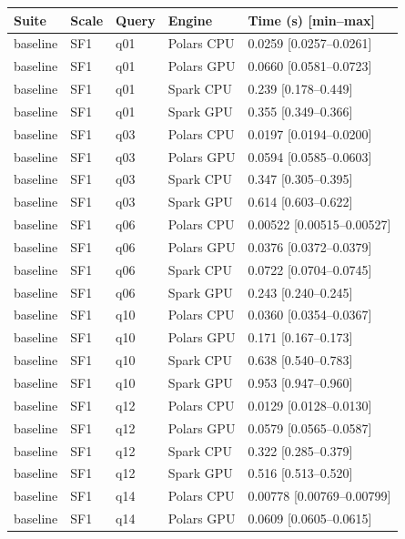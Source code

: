 \begin{longtable}{lllll}
\toprule
Suite & Scale & Query & Engine & Time (s) [min--max] \\
\midrule
\endhead
\bottomrule
\endfoot
baseline & SF1 & q01 & Polars CPU & 0.0259 [0.0257--0.0261] \\
baseline & SF1 & q01 & Polars GPU & 0.0660 [0.0581--0.0723] \\
baseline & SF1 & q01 & Spark CPU & 0.239 [0.178--0.449] \\
baseline & SF1 & q01 & Spark GPU & 0.355 [0.349--0.366] \\
baseline & SF1 & q03 & Polars CPU & 0.0197 [0.0194--0.0200] \\
baseline & SF1 & q03 & Polars GPU & 0.0594 [0.0585--0.0603] \\
baseline & SF1 & q03 & Spark CPU & 0.347 [0.305--0.395] \\
baseline & SF1 & q03 & Spark GPU & 0.614 [0.603--0.622] \\
baseline & SF1 & q06 & Polars CPU & 0.00522 [0.00515--0.00527] \\
baseline & SF1 & q06 & Polars GPU & 0.0376 [0.0372--0.0379] \\
baseline & SF1 & q06 & Spark CPU & 0.0722 [0.0704--0.0745] \\
baseline & SF1 & q06 & Spark GPU & 0.243 [0.240--0.245] \\
baseline & SF1 & q10 & Polars CPU & 0.0360 [0.0354--0.0367] \\
baseline & SF1 & q10 & Polars GPU & 0.171 [0.167--0.173] \\
baseline & SF1 & q10 & Spark CPU & 0.638 [0.540--0.783] \\
baseline & SF1 & q10 & Spark GPU & 0.953 [0.947--0.960] \\
baseline & SF1 & q12 & Polars CPU & 0.0129 [0.0128--0.0130] \\
baseline & SF1 & q12 & Polars GPU & 0.0579 [0.0565--0.0587] \\
baseline & SF1 & q12 & Spark CPU & 0.322 [0.285--0.379] \\
baseline & SF1 & q12 & Spark GPU & 0.516 [0.513--0.520] \\
baseline & SF1 & q14 & Polars CPU & 0.00778 [0.00769--0.00799] \\
baseline & SF1 & q14 & Polars GPU & 0.0609 [0.0605--0.0615] \\

\end{longtable}
